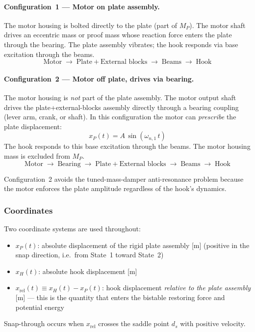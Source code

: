 \documentclass[11pt,letterpaper]{article}
\begin{document}
\paragraph{Configuration~1 --- Motor on plate assembly.}
The motor housing is bolted directly to the plate (part of $M_P$).  The
motor shaft drives an eccentric mass or proof mass whose reaction force
enters the plate through the bearing.  The plate assembly vibrates; the hook
responds via base excitation through the beams.
$$\text{Motor} \;\to\; \text{Plate} + \text{External blocks} \;\to\;
  \text{Beams} \;\to\; \text{Hook}$$

\paragraph{Configuration~2 --- Motor off plate, drives via bearing.}
The motor housing is \emph{not} part of the plate assembly.  The motor output
shaft drives the plate+external-blocks assembly directly through a bearing
coupling (lever arm, crank, or shaft).  In this configuration the motor can
\emph{prescribe} the plate displacement:
$$x_P(t) = A\,\sin(\omega_{n,1}\,t)$$
The hook responds to this base excitation through the beams.  The motor
housing mass is excluded from $M_P$.
$$\text{Motor} \;\to\; \text{Bearing} \;\to\;
  \text{Plate} + \text{External blocks} \;\to\; \text{Beams} \;\to\; \text{Hook}$$

Configuration~2 avoids the tuned-mass-damper anti-resonance problem because the
motor enforces the plate amplitude regardless of the hook's dynamics.

\subsubsection{Coordinates}

Two coordinate systems are used throughout:
\begin{itemize}[nosep]
  \item $x_P(t)$: absolute displacement of the rigid plate assembly [m]
    (positive in the snap direction, i.e.\ from State~1 toward State~2)
  \item $x_H(t)$: absolute hook displacement [m]
  \item $x_{\mathrm{rel}}(t) \equiv x_H(t) - x_P(t)$: hook displacement
    \emph{relative to the plate assembly} [m] --- this is the quantity that
    enters the bistable restoring force and potential energy
\end{itemize}

Snap-through occurs when $x_{\mathrm{rel}}$ crosses the saddle point
$d_s$ with positive velocity.
\end{document}
